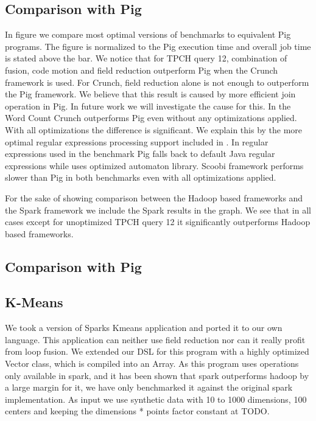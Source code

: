 \subsection{Comparison with Pig}
\label{subsec:pig}
In figure \todo{\ref{}} we compare most optimal versions of benchmarks to equivalent Pig programs. The figure is normalized to the Pig execution time and overall job time is stated above the bar. We notice that for TPCH query 12, combination of fusion, code motion and field reduction outperform Pig when the Crunch framework is used. For Crunch, field reduction alone is not enough to outperform the Pig framework. We believe that this result is caused by more efficient join operation in Pig. In future work we will investigate the cause for this. In the Word Count Crunch outperforms Pig even without any optimizations applied. With all optimizations the difference is significant. We explain this by the more optimal regular expressions processing support included in \tool. In regular expressions used in the benchmark Pig falls back to default Java regular expressions while \tool uses optimized automaton library. Scoobi framework performs slower than Pig in both benchmarks even with all optimizations applied.

For the sake of showing comparison between the Hadoop based frameworks and the Spark framework we include the Spark results in the graph. We see that in all cases except for unoptimized TPCH query 12 it significantly outperforms Hadoop based frameworks.

\subsection{Comparison with Pig}
\label{subsec:pig}

\subsection{K-Means}
\label{subsec:kmeans}
We took a version of Sparks Kmeans application and ported it to our own language. This application can neither use field reduction nor can it really profit from loop fusion. We extended our DSL for this program with a highly optimized Vector class, which is compiled into an Array. As this program uses operations only available in spark, and it has been shown that spark outperforms hadoop by a large margin for it, we have only benchmarked it against the original spark implementation. As input we use synthetic data with 10 to 1000 dimensions, 100 centers and keeping the dimensions * points factor constant at TODO. \\
